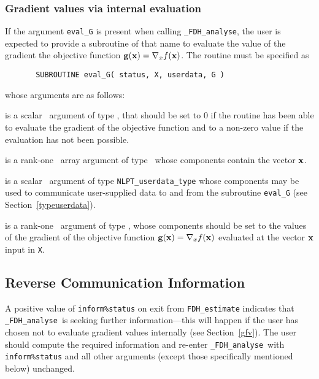 \documentclass{galahad}
\newcommand{\packagename}{FDH}
\newcommand{\fullpackagename}{\libraryname\_\packagename}
\newcommand{\solver}{{\tt \fullpackagename\_analyse}}
\begin{document}

\subsubsection{Gradient values via internal evaluation\label{gfv}}

If the argument {\tt eval\_G} is present when calling \solver, the
user is expected to provide a subroutine of that name to evaluate the
value of the gradient the objective function ${\mathbf{g}}({\mathbf{x}}) = \nabla_x f({\mathbf{x}})$.
The routine must be specified as

\def\baselinestretch{0.8}
{\tt \begin{verbatim}
       SUBROUTINE eval_G( status, X, userdata, G )
\end{verbatim} }
\def\baselinestretch{1.0}
\noindent whose arguments are as follows:

\begin{description}
 is a scalar \intentout\ argument of type \integer,
that should be set to 0 if the routine has been able to evaluate
the gradient of the objective function
and to a non-zero value if the evaluation has not been possible.

 is a rank-one \intentin\ array argument of type \realdp\
whose components contain the vector ${\mathbf{x}}$.

 is a scalar \intentinout\ argument of type 
{\tt NLPT\_userdata\_type} whose components may be used
to communicate user-supplied data to and from the subroutine {\tt eval\_G}
(see Section~\ref{typeuserdata}). 

 is a rank-one \intentout\ argument of type \realdp,
whose components should be set to the values of the gradient 
of the objective function ${\mathbf{g}}({\mathbf{x}}) = \nabla_x f({\mathbf{x}})$
evaluated at the vector ${\mathbf{x}}$ input in {\tt X}.

\end{description}


\subsection{\label{reverse}Reverse Communication Information}

A positive value of {\tt inform\%status} on exit from 
{\tt \packagename\_estimate}
indicates that
\solver\ is seeking further information---this will happen 
if the user has chosen not to evaluate gradient
values internally (see Section~\ref{gfv}).
The user should compute the required information and re-enter \solver\
with {\tt inform\%status} and all other arguments (except those specifically
mentioned below) unchanged.
\end{document}
